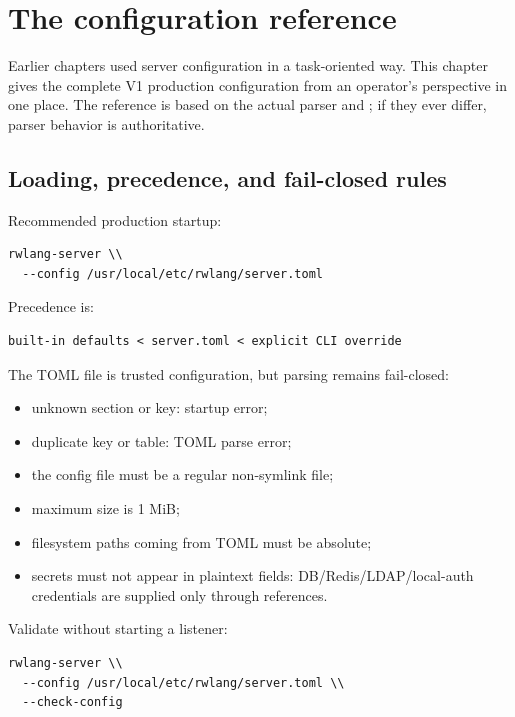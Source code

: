 \chapter{The  configuration reference}

Earlier chapters used server configuration in a task-oriented way. This chapter gives the complete V1 production configuration from an operator's perspective in one place. The reference is based on the actual parser and ; if they ever differ, parser behavior is authoritative.

\section{Loading, precedence, and fail-closed rules}

Recommended production startup:

\begin{lstlisting}
rwlang-server \\
  --config /usr/local/etc/rwlang/server.toml
\end{lstlisting}

Precedence is:

\begin{lstlisting}
built-in defaults < server.toml < explicit CLI override
\end{lstlisting}

The TOML file is trusted configuration, but parsing remains fail-closed:

\begin{itemize}
  \item unknown section or key: startup error;
  \item duplicate key or table: TOML parse error;
  \item the config file must be a regular non-symlink file;
  \item maximum size is 1 MiB;
  \item filesystem paths coming from TOML must be absolute;
  \item secrets must not appear in plaintext fields: DB/Redis/LDAP/local-auth credentials are supplied only through  references.
\end{itemize}

Validate without starting a listener:

\begin{lstlisting}
rwlang-server \\
  --config /usr/local/etc/rwlang/server.toml \\
  --check-config
\end{lstlisting}

